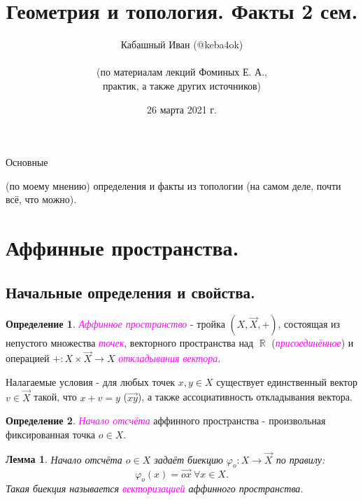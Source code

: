 \documentclass[a4paper,100pt]{article}
\title{Геометрия и топология. Факты 2 сем.}
\author{Кабашный Иван (@keba4ok)\\ \\ (по материалам лекций Фоминых Е. А.,\\ практик, а также других источников)}
\date{26 марта 2021 г.}
\theoremstyle{indented}
\newtheorem{lemma}{Лемма}
\theoremstyle{definition}
\newtheorem{defn}{Определение}
\theoremstyle{remark}
\DeclareMathOperator{\ra}{\rightarrow}
\DeclareMathOperator{\RR}{\mathbb{R}}
\begin{document}
\newcommand{\resetexlcounters}{%
  \setcounter{exl}{0}%
} 

\newcommand{\resetremarkcounters}{%
  \setcounter{remark}{0}%
} 

\newcommand{\reseconscounters}{%
  \setcounter{cons}{0}%
} 

\newcommand{\resetall}{%
    \resetexlcounters
    \resetremarkcounters
    \reseconscounters%
}

\maketitle 

\newpage

\hypertarget{t1}{Основные} (по моему мнению) определения и факты из топологии (на самом деле, почти всё, что можно).
\tableofcontents

\newpage


\section{Аффинные пространства.}

\subsection{Начальные определения и свойства.}

\begin{defn}
    \textit{\textcolor{magenta}{\hypertarget{s1}{Аффинное пространство}}} - тройка $(X, \vec{X}, +)$, состоящая из непустого множества \textit{\textcolor{magenta}{\hypertarget{s2}{точек}}}, векторного пространства над $\RR$ (\textit{\textcolor{magenta}{\hypertarget{s3}{присоединённое}}}) и операцией $+:X\times \vec{X}\ra X$ \textit{\textcolor{magenta}{\hypertarget{s4}{откладывания вектора}}}. \ 

    Налагаемые условия - для любых точек $x, y\in X$ существует единственный вектор $v\in \vec{X}$ такой, что $x+v=y$ ($\vec{xy}$), а также ассоциативность откладывания вектора.
\end{defn}

\begin{defn}
    \textit{\textcolor{magenta}{\hypertarget{s5}{Начало отсчёта}}} аффинного пространства - произвольная фиксированная точка $o\in X$. 
\end{defn}

\begin{lemma}
    Начало отсчёта $o\in X$ задаёт биекцию $\varphi_o: X\ra \vec{X}$ по правилу:
    \[
        \varphi_o(x)=\vec{ox} \: \forall x \in X. 
    \]
    Такая биекция называется \textit{\textcolor{magenta}{\hypertarget{s6}{векторизацией}}} аффинного пространства.
\end{lemma}
\end{document}
